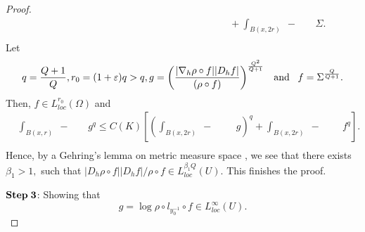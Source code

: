 \documentclass[11pt,twoside]{article}
\theoremstyle{definition}
\theoremstyle{remark}
\begin{document}
\begin{proof}
\begin{equation}
\begin{aligned}
&\,\,\,\,\,\,\,\,\,\,\,\,\,\,\,\,\,\,\,\,\,\,\,\,\,\,\,\,\,\,\,\,\,\,\,\,\,\,\,\,\,\,\,\,\,\,\,\,\,\,\,\,\,\,\,\,\,\,\,\,\,\,\,\,\,\,\,\,\,\,\,\,\,\,\,\,\,\,\,\,\,\,\,\,\,\,\,\,\,\,\,\,\,\,\,\,\,\,\,
\,\,\,\,\,\,\,\,\,\,\,\,+
\int_{B(x,2r)}\!\!\!\!\!\!\!\!\!\!\!\!\!\!\!\!\!\!\!\!\!\!\!\; {}-{} \,\,\,\,\,\,\,\,\,\,\,\Sigma.\\
\end{aligned}
\end{equation}
Let $$q=\frac{Q+1}{Q}, r_{0}=(1+\varepsilon)q>q, g=\left(\frac{\vert\nabla_{h}\rho\circ f\vert\vert D_{h}f\vert}{(\rho\circ f)}\right)^{\frac{Q^{2}}{Q+1}}\;\;\;{\rm and}\;\;\;f=\Sigma^{\frac{Q}{Q+1}}.$$
Then, $f\in L_{loc}^{r_{0}}(\Omega)$ and 
\begin{equation}
\begin{aligned}
&\int_{B(x,r)}\!\!\!\!\!\!\!\!\!\!\!\!\!\!\!\!\!\!\!\!\; {}-{} \,\,\,\,\,\,\,\,\,\,\,g^{q}\leq C(K)\left[\left(\int_{B(x,2r)}\!\!\!\!\!\!\!\!\!\!\!\!\!\!\!\!\!\!\!\!\!\!\!\; {}-{} \,\,\,\,\,\,\,\,\,\,\,\,\,\,g\right)^{q}+
\int_{B(x,2r)}\!\!\!\!\!\!\!\!\!\!\!\!\!\!\!\!\!\!\!\!\!\!\!\; {}-{} \,\,\,\,\,\,\,\,\,\,\,\,\,f^{q}\right].\\
\end{aligned}
\end{equation}
Hence, by a Gehring's lemma on metric measure space \cite[Theorem 3.3]{Gol05}, we see that   there exists $\beta_{1}>1,$ such that $\vert D_{h}\rho\circ f\vert\vert D_{h}f\vert/\rho\circ f\in L_{loc}^{\beta_{1} Q}(U).$ This finishes the proof.







${\rm \mathbf{Step}\;\mathbf{3}}$: Showing that $$g=\log\rho\circ l_{y_{0}^{-1}}\circ f\in L_{loc}^{\infty}(U).$$


\end{proof}
\end{document}
